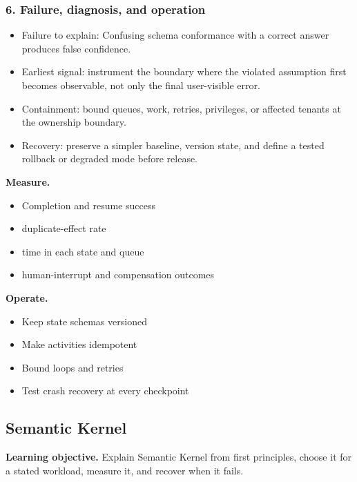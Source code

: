 \subsubsection*{6. Failure, diagnosis, and operation}
\begin{itemize}
\item Failure to explain: Confusing schema conformance with a correct answer produces false confidence.
\item Earliest signal: instrument the boundary where the violated assumption first becomes observable, not only the final user-visible error.
\item Containment: bound queues, work, retries, privileges, or affected tenants at the ownership boundary.
\item Recovery: preserve a simpler baseline, version state, and define a tested rollback or degraded mode before release.
\end{itemize}
\textbf{Measure.}\begin{itemize}
\item Completion and resume success
\item duplicate-effect rate
\item time in each state and queue
\item human-interrupt and compensation outcomes
\end{itemize}
\textbf{Operate.}\begin{itemize}
\item Keep state schemas versioned
\item Make activities idempotent
\item Bound loops and retries
\item Test crash recovery at every checkpoint
\end{itemize}
\subsection{Semantic Kernel}
\textbf{Learning objective.} Explain Semantic Kernel from first principles, choose it for a stated workload, measure it, and recover when it fails.
